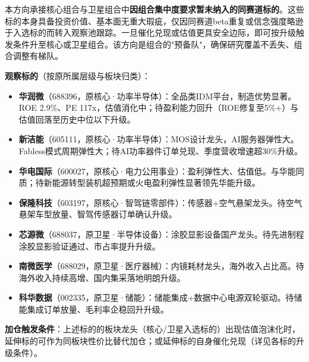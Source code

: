 本方向承接核心组合与卫星组合中\textbf{因组合集中度要求暂未纳入的同赛道标的}。这些标的本身具备投资价值、基本面无重大瑕疵，仅因同赛道beta重复或信念强度略逊于入选标的而转入观察池跟踪。一旦催化兑现或估值更具安全边际，即可按升级触发条件升至核心或卫星组合。该方向是组合的"预备队"，确保研究覆盖不丢失、组合调整有梯队。

\textbf{观察标的}（按原所属层级与板块归类）：
\vspace{0.2em}
\begin{itemize}[leftmargin=2em]
\item \textbf{华润微}（688396，原核心·功率半导体）：全品类IDM平台，制造优势显著。ROE 2.9\%、PE 117x，估值消化中；待盈利能力回升（ROE修复至5\%+）与估值回落至历史中位以下升级。
\item \textbf{新洁能}（605111，原核心·功率半导体）：MOS设计龙头，AI服务器弹性大。Fabless模式周期弹性大；待AI功率器件订单兑现、季度营收增速超30\%升级。
\item \textbf{华电国际}（600027，原核心·电力公用事业）：盈利弹性大、估值低。与华能同质；待新能源转型装机超预期或火电盈利弹性显著领先华能升级。
\item \textbf{保隆科技}（603197，原核心·智驾链零部件）：传感器+空气悬架龙头。待空气悬架车型放量、智驾传感器订单确认升级。
\item \textbf{芯源微}（688037，原卫星·半导体设备）：涂胶显影设备国产龙头。待先进制程涂胶显影验证通过、市占率提升升级。
\item \textbf{南微医学}（688029，原卫星·医疗器械）：内镜耗材龙头，海外收入占比高。待海外收入持续高增、国内集采落地明朗升级。
\item \textbf{科华数据}（002335，原卫星·储能）：储能集成+数据中心电源双轮驱动。待储能集成订单放量、毛利率企稳回升升级。
\end{itemize}

\textbf{加仓触发条件}：上述标的的板块龙头（核心/卫星入选标的）出现估值泡沫化时，延伸标的可作为同板块性价比替代加仓；或延伸标的自身催化兑现（详见各标的升级条件）。

